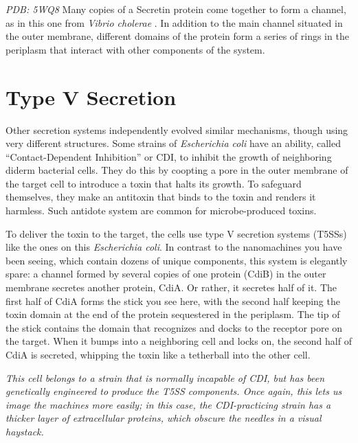 \documentclass[]{tufte-book}
\begin{document}
\emph{PDB: 5WQ8} Many copies of a Secretin protein come together to form
a channel, as in this one from \emph{Vibrio cholerae} \citep{yan2017a}.
In addition to the main channel situated in the outer membrane,
different domains of the protein form a series of rings in the periplasm
that interact with other components of the system.

\section{Type V Secretion}\label{type-v-secretion}

Other secretion systems independently evolved similar mechanisms, though
using very different structures. Some strains of \emph{Escherichia coli}
have an ability, called ``Contact-Dependent Inhibition'' or CDI, to
inhibit the growth of neighboring diderm bacterial cells. They do this
by coopting a pore in the outer membrane of the target cell to introduce
a toxin that halts its growth. To safeguard themselves, they make an
antitoxin that binds to the toxin and renders it harmless. Such antidote
system are common for microbe-produced toxins.

To deliver the toxin to the target, the cells use type V secretion
systems (T5SSs) like the ones on this \emph{Escherichia coli}. In
contrast to the nanomachines you have been seeing, which contain dozens
of unique components, this system is elegantly spare: a channel formed
by several copies of one protein (CdiB) in the outer membrane secretes
another protein, CdiA. Or rather, it secretes half of it. The first half
of CdiA forms the stick you see here, with the second half keeping the
toxin domain at the end of the protein sequestered in the periplasm. The
tip of the stick contains the domain that recognizes and docks to the
receptor pore on the target. When it bumps into a neighboring cell and
locks on, the second half of CdiA is secreted, whipping the toxin like a
tetherball into the other cell.

\emph{This cell belongs to a strain that is normally incapable of CDI,
but has been genetically engineered to produce the T5SS components. Once
again, this lets us image the machines more easily; in this case, the
CDI-practicing strain has a thicker layer of extracellular proteins,
which obscure the needles in a visual haystack.}
\end{document}
